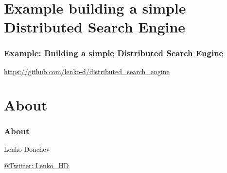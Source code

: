 \documentclass{beamer}
\begin{document}
\section{Example building a simple Distributed Search Engine}

\frame
{
  \frametitle{Example: Building a  simple Distributed Search Engine}
  \href{https://github.com/lenko-d/distributed\_search\_engine\_in\_akka}{https://github.com/lenko-d/distributed\_search\_engine}
}




\section{About}

\frame
{
	\frametitle{About}
        \begin{center}
        Lenko Donchev 
        \end{center}
        \begin{center}
        \href{http://twitter.com/Lenko\_HD}{ @Twitter: Lenko\_HD}
        \end{center}
}
\end{document}
